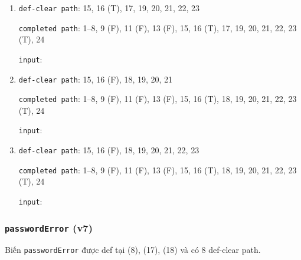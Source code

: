 \documentclass{article}
\begin{document}
\begin{enumerate}
    \item \texttt{def-clear path}: 15, 16 (T), 17, 19, 20, 21, 22, 23
          \par \texttt{completed path}: 1--8, 9 (F), 11 (F), 13 (F), 15, 16 (T), 17, 19, 20, 21, 22, 23 (T), 24
          \par \texttt{input}:

    \item \texttt{def-clear path}: 15, 16 (F), 18, 19, 20, 21
          \par \texttt{completed path}: 1--8, 9 (F), 11 (F), 13 (F), 15, 16 (T), 18, 19, 20, 21, 22, 23 (T), 24
          \par \texttt{input}:

    \item \texttt{def-clear path}: 15, 16 (F), 18, 19, 20, 21, 22, 23
          \par \texttt{completed path}: 1--8, 9 (F), 11 (F), 13 (F), 15, 16 (T), 18, 19, 20, 21, 22, 23 (T), 24
          \par \texttt{input}:

\end{enumerate}

\subsubsection*{\texttt{passwordError} (v7)}

\par Biến \texttt{passwordError} được def tại (8), (17), (18) và có 8 def-clear path.
\end{document}
